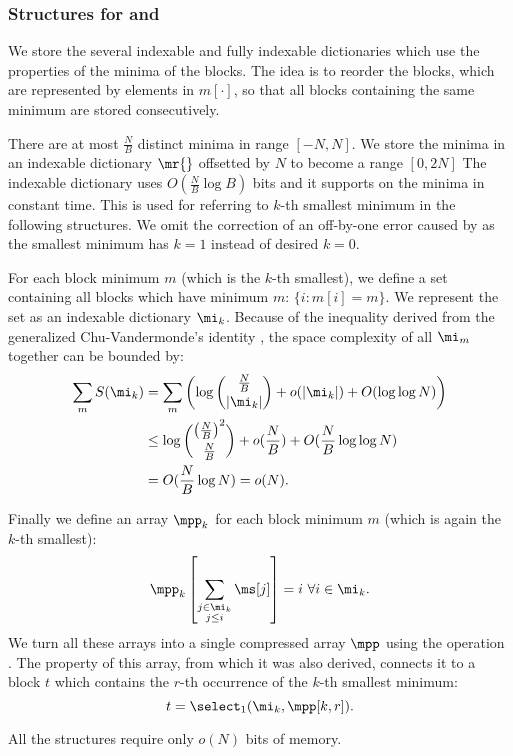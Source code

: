 \subsubsection{Structures for \rmqSize{} and \rmqSelect{}}

We store the several indexable and fully indexable dictionaries which use the properties of the minima of the blocks.
The idea is to reorder the blocks, which are represented by elements in $m[\cdot]$, so that all blocks containing the same minimum are stored consecutively. 

There are at most $\frac{N}{B}$ distinct minima in range $[-N, N]$.
We store the minima in an indexable dictionary $\mr{}$ offsetted by $N$ to become a range $[0, 2 N]$
The indexable dictionary uses $O(\frac{N}{B} \log B)$ bits and it supports \rank{} on the minima in constant time.
This is used for referring to $k$-th smallest minimum in the following structures.
We omit the correction of an off-by-one error caused by \rank{} as the smallest minimum has $k = 1$ instead of desired $k = 0$.

For each block minimum $m$ (which is the $k$-th smallest), we define a set containing all blocks which have minimum $m$: $\{ i : m[i] = m\}$.
We represent the set as an indexable dictionary $\mi_k$.
Because of the inequality derived from the generalized Chu-Vandermonde's identity \cite{belbachircombinatorial}, the space complexity of all $\mi_m$ together can be bounded by:
\begin{align*}
	\sum_m S(\mi_k) &= \sum_m \left( \log {\frac{N}{B} \choose |\mi_k|} + o(|\mi_k|) + O(\log \log N) \right) \\
	&\le \log {\left(\frac{N}{B}\right)^2 \choose \frac{N}{B}} + o(\frac{N}{B}) + O(\frac{N}{B} \log \log N) \\
	&= O(\frac{N}{B} \log N) = o(N).
\end{align*}

Finally we define an array $\mpp_k$ for each block minimum $m$ (which is again the $k$-th smallest):
$$\mpp_k\left[\sum_{\substack{j \in \mi_k \\ j \le i}} \ms[j] \right] = i \ \forall i \in \mi_k.$$
We turn all these arrays into a single compressed array $\mpp$ using the operation \succ{}.
The property of this array, from which it was also derived, connects it to a block $t$ which contains the $r$-th occurrence of the $k$-th smallest minimum:
$$ t = \select_1(\mi_k, \mpp[k, r]). $$

All the structures require only $o(N)$ bits of memory.

